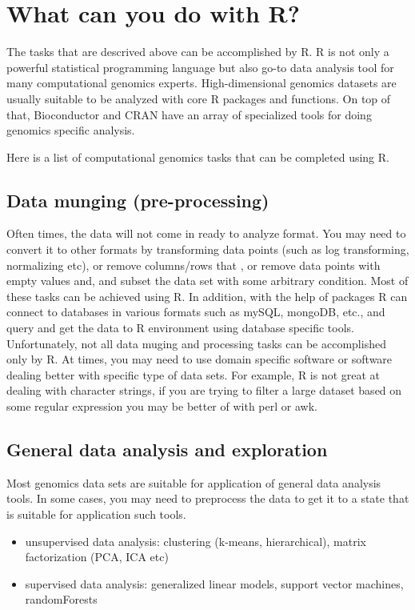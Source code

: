 \documentclass[english,nohyper]{tufte-book}\usepackage[]{graphicx}\usepackage[]{color}
\begin{document}
\section{What can you do with R?}

The tasks that are descrived above can be accomplished by R. R is
not only a powerful statistical programming language but also go-to
data analysis tool for many computational genomics experts. High-dimensional
genomics datasets are usually suitable to be analyzed with core R
packages and functions. On top of that, Bioconductor and CRAN have
an array of specialized tools for doing genomics specific analysis. 

Here is a list of computational genomics tasks that can be completed
using R.


\subsection{Data munging (pre-processing)}

Often times, the data will not come in ready to analyze format. You
may need to convert it to other formats by transforming data points
(such as log transforming, normalizing etc), or remove columns/rows
that , or remove data points with empty values and, and subset the
data set with some arbitrary condition. Most of these tasks can be
achieved using R. In addition, with the help of packages R can connect
to databases in various formats such as mySQL, mongoDB, etc., and
query and get the data to R environment using database specific tools.
Unfortunately, not all data muging and processing tasks can be accomplished
only by R. At times, you may need to use domain specific software
or software dealing better with specific type of data sets. For example,
R is not great at dealing with character strings, if you are trying
to filter a large dataset based on some regular expression you may
be better of with perl or awk. 


\subsection{General data analysis and exploration}

Most genomics data sets are suitable for application of general data
analysis tools. In some cases, you may need to preprocess the data
to get it to a state that is suitable for application such tools.
\begin{itemize}
\item unsupervised data analysis: clustering (k-means, hierarchical), matrix
factorization (PCA, ICA etc)
\item supervised data analysis: generalized linear models, support vector
machines, randomForests
\end{itemize}
\end{document}
